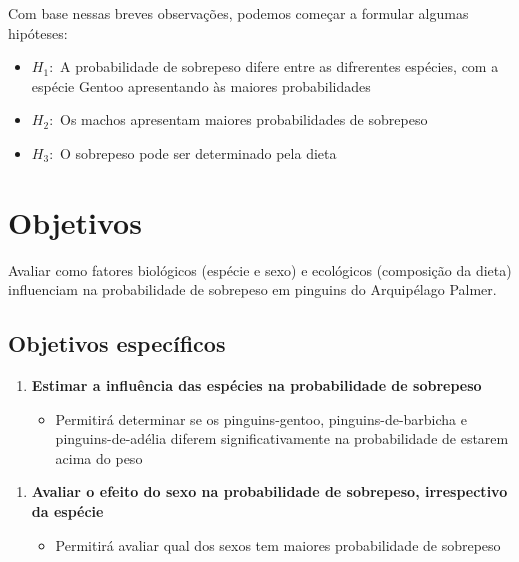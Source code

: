 \documentclass[
]{book}
\providecommand{\tightlist}{%
  \setlength{\itemsep}{0pt}\setlength{\parskip}{0pt}}
\begin{document}
Com base nessas breves observações, podemos começar a formular algumas hipóteses:

\begin{itemize}
\item
  \(H_1:\) A probabilidade de sobrepeso difere entre as difrerentes espécies, com a espécie Gentoo apresentando às maiores probabilidades
\item
  \(H_2:\) Os machos apresentam maiores probabilidades de sobrepeso
\item
  \(H_3:\) O sobrepeso pode ser determinado pela dieta
\end{itemize}

\section{Objetivos}\label{objetivos}

Avaliar como fatores biológicos (espécie e sexo) e ecológicos (composição da dieta) influenciam na probabilidade de sobrepeso em pinguins do Arquipélago Palmer.

\subsection{Objetivos específicos}\label{objetivos-especuxedficos}

\begin{enumerate}
\def\labelenumi{(\roman{enumi})}
\tightlist
\item
  \textbf{Estimar a influência das espécies na probabilidade de sobrepeso}

  \begin{itemize}
  \tightlist
  \item
    Permitirá determinar se os pinguins-gentoo, pinguins-de-barbicha e pinguins-de-adélia diferem significativamente na probabilidade de estarem acima do peso
  \end{itemize}
\end{enumerate}

\begin{enumerate}
\def\labelenumi{(\roman{enumi})}
\setcounter{enumi}{1}
\tightlist
\item
  \textbf{Avaliar o efeito do sexo na probabilidade de sobrepeso, irrespectivo da espécie}

  \begin{itemize}
  \tightlist
  \item
    Permitirá avaliar qual dos sexos tem maiores probabilidade de sobrepeso
  \end{itemize}
\end{enumerate}
\end{document}
